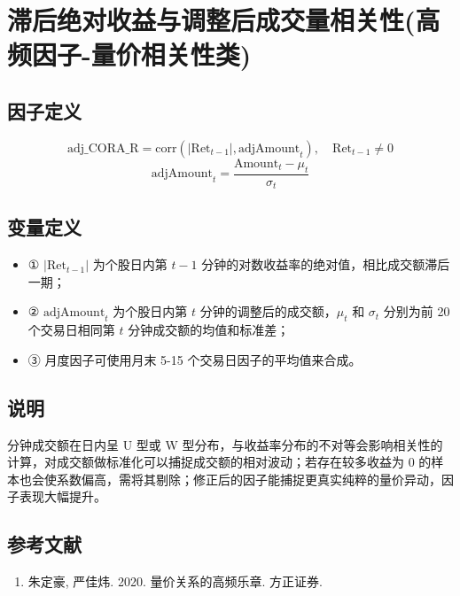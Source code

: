 \documentclass{article}
\begin{document}
\section{滞后绝对收益与调整后成交量相关性(高频因子-量价相关性类)}

\subsection{因子定义}


\begin{equation}
    \mathrm{adj\_CORA\_R} = \mathrm{corr}(|\mathrm{Ret}_{t-1}|, \mathrm{adjAmount}_t), \quad \mathrm{Ret}_{t-1} \neq 0
\end{equation}
\begin{equation}
    \mathrm{adjAmount}_t = \frac{\mathrm{Amount}_t - \mu_t}{\sigma_t}
\end{equation}

\subsection{变量定义}
\begin{itemize}
    \item ① \( |\mathrm{Ret}_{t-1}| \) 为个股日内第 \( t-1 \) 分钟的对数收益率的绝对值，相比成交额滞后一期；
    \item ② \( \mathrm{adjAmount}_t \) 为个股日内第 \( t \) 分钟的调整后的成交额，\( \mu_t \) 和 \( \sigma_t \) 分别为前 20 个交易日相同第 \( t \) 分钟成交额的均值和标准差；
    \item ③ 月度因子可使用月末 5-15 个交易日因子的平均值来合成。
\end{itemize}

\subsection{说明}
分钟成交额在日内呈 U 型或 W 型分布，与收益率分布的不对等会影响相关性的计算，对成交额做标准化可以捕捉成交额的相对波动；若存在较多收益为 0 的样本也会使系数偏高，需将其剔除；修正后的因子能捕捉更真实纯粹的量价异动，因子表现大幅提升。

\subsection{参考文献}
\begin{enumerate}
    \item 朱定豪, 严佳炜. 2020. 量价关系的高频乐章. 方正证券.
\end{enumerate}
\end{document}

